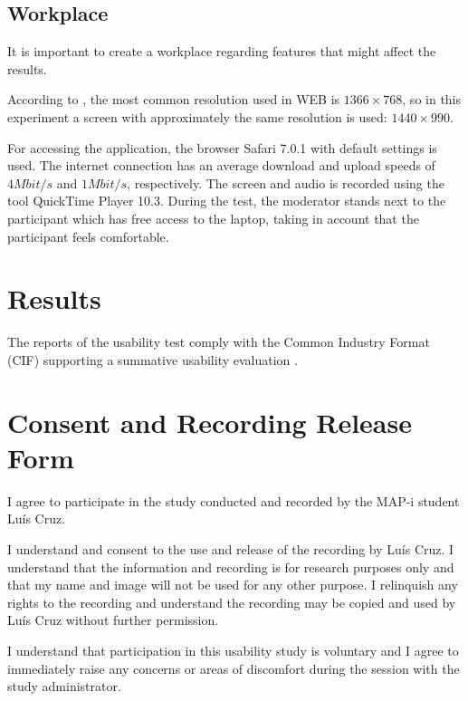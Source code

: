 \documentclass[a4paper]{article}
\begin{document}
\subsection{Workplace}
It is important to create a workplace regarding features that might affect the results.

According to \citep{http://www.satya-weblog.com/2013/07/desktop-laptop-mobile-screen-resolution-most-common-worldwide.html}, the most common resolution used in WEB is $1366\times 768$, so in this experiment a screen with approximately the same resolution is used: $1440\times 990$.

For accessing the application, the browser Safari 7.0.1 with default settings is used. The internet connection has an average download and upload speeds of $4 Mbit/s$ and $1Mbit/s$, respectively. The screen and audio is recorded using the tool QuickTime Player 10.3. During the test, the moderator stands next to the participant which has free access to the laptop, taking in account that the participant feels comfortable.



\section{Results}
The reports of the usability test comply with the Common Industry Format (CIF) supporting a summative usability evaluation \citep{iusr2006cif}.

\appendix
\section{Consent and Recording Release Form}

I agree to participate in the study conducted and recorded by the MAP-i student Luís Cruz. 

I understand and consent to the use and release of the recording by Luís Cruz. I understand that the information and recording is for research purposes only and that my name and image will not be used for any other purpose. I relinquish any rights to the recording and understand the recording may be copied and used by Luís Cruz without further permission. 

I understand that participation in this usability study is voluntary and I agree to immediately raise any concerns or areas of discomfort during the session with the study administrator.
\end{document}
